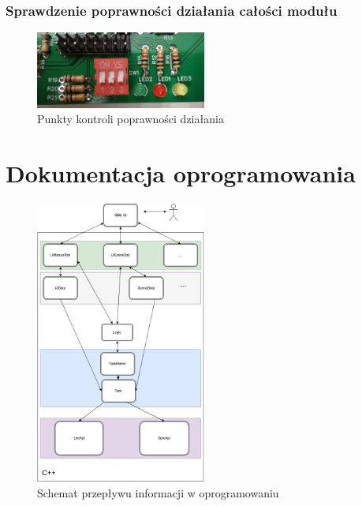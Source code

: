 \documentclass[12pt, eng, twoside, openany, final]{mgr}
\begin{document}
            \subsubsection{Sprawdzenie poprawności działania całości modułu}
                \begin{figure}[H]
                \begin{center}
                    \includegraphics[width=0.5\textwidth]{dip_zoom.jpg}
                    \caption{Punkty kontroli poprawności działania}
                \end{center}
                \end{figure}
            \newpage
            
            \section{Dokumentacja oprogramowania}
                \begin{figure}[H]
                \begin{center}
                    \includegraphics[width=0.5\textwidth]{inz_diag.png}
                    \caption{Schemat przepływu informacji w oprogramowaniu}
                \end{center}
                \end{figure}
                
\end{document}
